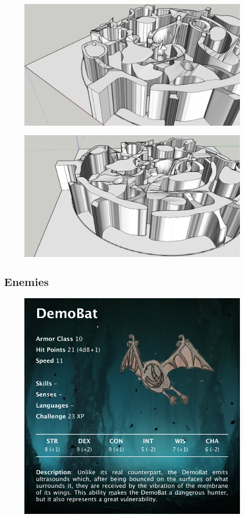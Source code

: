 \begin{figure}[H]
	\centering
	\includegraphics[width=14cm]{images/map/3D_map_013.png}
\end{figure}
\vspace*{3cm}
\begin{figure}[H]
	\centering
	\includegraphics[width=14cm]{images/map/3D_map_014.png}
\end{figure}

\newpage


\subsection{Enemies}

\vspace*{0.3cm}

\begin{figure}[H]
	\centering
	\includegraphics[width=0.7\linewidth]{images/visual_stats/demobat.png}
\end{figure}


